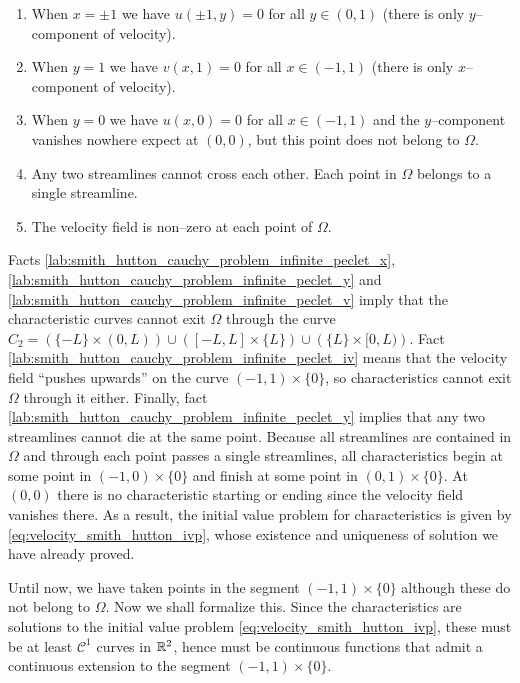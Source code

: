 \begin{enumerate}[label={(\roman*)}, topsep=0pt]
\label{lab:smith_hutton_cauchy_problem_infinite_peclet_i}
	\item When $x = \pm 1$ we have $u(\pm 1, y) = 0$ for all $y \in (0, 1)$
	(there is only $y$--component of velocity).
	\label{lab:smith_hutton_cauchy_problem_infinite_peclet_x}
	\item When $y = 1$ we have $v(x, 1) = 0$ for all $x \in (-1,1)$ (there is
	only $x$--component of velocity).
	\label{lab:smith_hutton_cauchy_problem_infinite_peclet_y}
	\item When $y = 0$ we have $u(x,0) = 0$ for all $x \in (-1,1)$ and the
	$y$--component vanishes nowhere expect at $(0,0)$, but this point does not
	belong to $\Omega$.
	\label{lab:smith_hutton_cauchy_problem_infinite_peclet_iv}
	\item Any two streamlines cannot cross each other. Each point in $\Omega$
	belongs to a single streamline.
	\label{lab:smith_hutton_cauchy_problem_infinite_peclet_v}
	\item The velocity field is non--zero at each point of $\Omega$.
\end{enumerate}
Facts \ref{lab:smith_hutton_cauchy_problem_infinite_peclet_x},
\ref{lab:smith_hutton_cauchy_problem_infinite_peclet_y} and
\ref{lab:smith_hutton_cauchy_problem_infinite_peclet_v} imply that the
characteristic curves cannot exit $\Omega$ through the curve
$C_2 = \left( \{ -L \} \times (0,L) \right) \cup \left( [-L,L] \times \{ L \}
\right) \cup \left( \{ L \} \times [0,L) \right)$. Fact
\ref{lab:smith_hutton_cauchy_problem_infinite_peclet_iv} means that the
velocity field ``pushes upwards'' on the curve $(-1,1) \times \{ 0 \}$, so
characteristics cannot exit $\Omega$ through it either. Finally, fact
\ref{lab:smith_hutton_cauchy_problem_infinite_peclet_y} implies that any two
streamlines cannot die at the same point. Because all streamlines are contained
in $\Omega$ and through each point passes a single streamlines, all
characteristics begin at some point in $(-1,0) \times \{ 0 \}$ and finish at
some point in $(0,1) \times \{ 0 \}$. At $(0,0)$ there is no characteristic
starting or ending since the velocity field vanishes there. As a result, the
initial value problem for characteristics is given by
\eqref{eq:velocity_smith_hutton_ivp}, whose existence and uniqueness of solution
we have already proved. 

Until now, we have taken points in the segment $(-1,1) \times \{ 0 \}$ although
these do not belong to $\Omega$. Now we shall formalize this. Since the
characteristics are solutions to the initial value problem
\eqref{eq:velocity_smith_hutton_ivp}, these must be at least $\mathcal{C}^1$
curves in $\mathbb{R}^2$, hence must be continuous functions that admit a continuous
extension to the segment $(-1,1) \times \{ 0 \}$.

